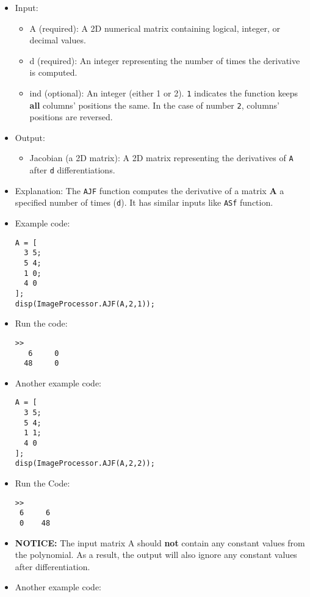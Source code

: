 \documentclass[11pt]{amsart}
\theoremstyle{remark}
\providecommand{\tightlist}{%
  \setlength{\itemsep}{0pt}\setlength{\parskip}{0pt}}
\theoremstyle{definition}
\theoremstyle{remark}
\numberwithin{equation}{section}
\begin{document}
\begin{itemize}
\item
  Input:

  \begin{itemize}
  \tightlist
  \item
    A (required): A 2D numerical matrix containing logical, integer, or
    decimal values.\\
  \item
    d (required): An integer representing the number of times the
    derivative is computed.\\
  \item
    ind (optional): An integer (either 1 or 2). \texttt{1} indicates the
    function keeps \textbf{all} columns' positions the same. In the case
    of number \texttt{2}, columns' positions are reversed.
  \end{itemize}
\item
  Output:

  \begin{itemize}
  \tightlist
  \item
    Jacobian (a 2D matrix): A 2D matrix representing the derivatives of
    \texttt{A} after \texttt{d} differentiations.
  \end{itemize}
\item
  Explanation: The \texttt{AJF} function computes the derivative of a
  matrix \textbf{A} a specified number of times (\texttt{d}). It has
  similar inputs like \texttt{ASf} function.
\item
  Example code:

\begin{verbatim}
A = [
  3 5;
  5 4;
  1 0;
  4 0
];
disp(ImageProcessor.AJF(A,2,1));
\end{verbatim}
\item
  Run the code:

\begin{verbatim}
>> 
   6     0
  48     0
\end{verbatim}
\item
  Another example code:

\begin{verbatim}
A = [
  3 5;
  5 4;
  1 1;
  4 0
];
disp(ImageProcessor.AJF(A,2,2));
\end{verbatim}
\item
  Run the Code:

\begin{verbatim}
>> 
 6     6
 0    48
\end{verbatim}
\item
  \textbf{NOTICE:} The input matrix A should \textbf{not} contain any
  constant values from the polynomial. As a result, the output will also
  ignore any constant values after differentiation.
\item
  Another example code:


\end{itemize}
\end{document}
